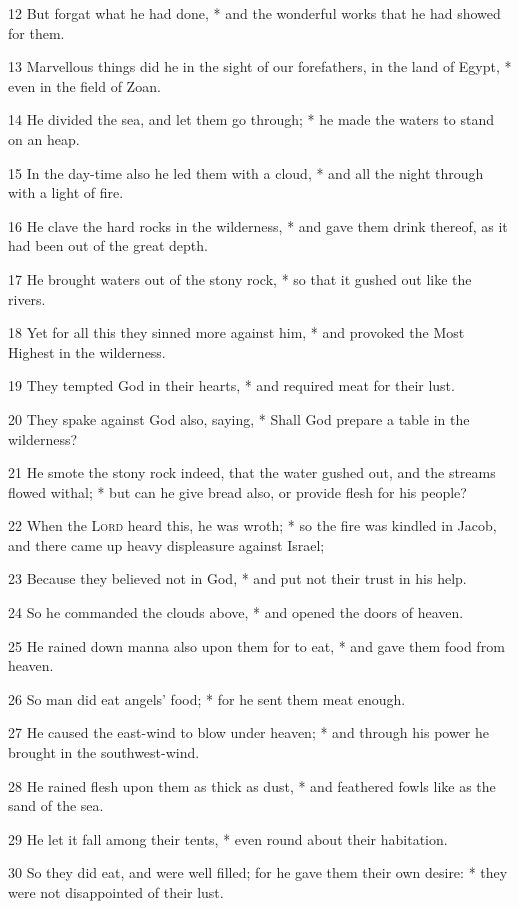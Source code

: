 12 But forgat what he had done, * and the wonderful works that he had showed for them.\par
13 Marvellous things did he in the sight of our forefathers, in the land of Egypt, * even in the field of Zoan.\par
14 He divided the sea, and let them go through; * he made the waters to stand on an heap.\par
15 In the day-time also he led them with a cloud, * and all the night through with a light of fire.\par
16 He clave the hard rocks in the wilderness, * and gave them drink thereof, as it had been out of the great depth.\par
17 He brought waters out of the stony rock, * so that it gushed out like the rivers.\par
18 Yet for all this they sinned more against him, * and provoked the Most Highest in the wilderness.\par
19 They tempted God in their hearts, * and required meat for their lust.\par
20 They spake against God also, saying, * Shall God prepare a table in the wilderness?\par
21 He smote the stony rock indeed, that the water gushed out, and the streams flowed withal; * but can he give bread also, or provide flesh for his people?\par
22 When the {\textsc{Lord}} heard this, he was wroth; * so the fire was kindled in Jacob, and there came up heavy displeasure against Israel;\par
23 Because they believed not in God, * and put not their trust in his help.\par
24 So he commanded the clouds above, * and opened the doors of heaven.\par
25 He rained down manna also upon them for to eat, * and gave them food from heaven.\par
26 So man did eat angels' food; * for he sent them meat enough.\par
27 He caused the east-wind to blow under heaven; * and through his power he brought in the southwest-wind.\par
28 He rained flesh upon them as thick as dust, * and feathered fowls like as the sand of the sea.\par
29 He let it fall among their tents, * even round about their habitation.\par
30 So they did eat, and were well filled; for he gave them their own desire: * they were not disappointed of their lust.\par
